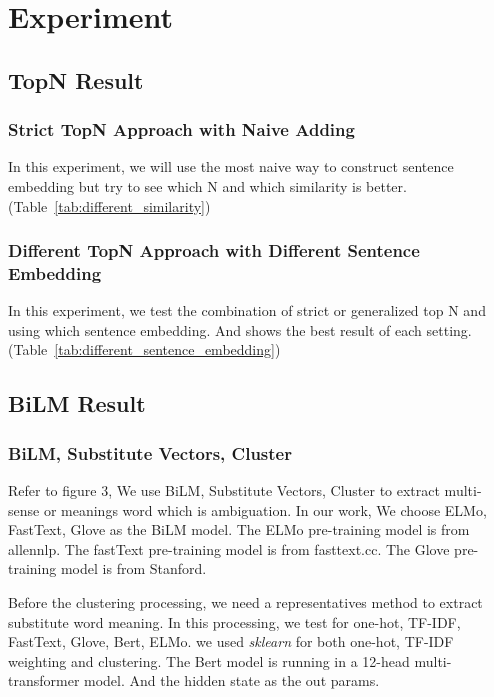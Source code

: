\section{Experiment}
\label{sec:experiment}

\subsection*{TopN Result}

\subsubsection*{Strict TopN Approach with Naive Adding}

In this experiment, we will use the most naive way to construct sentence embedding but try to see which N and which similarity is better. (Table~\ref{tab:different_similarity})




\subsubsection*{Different TopN Approach with Different Sentence Embedding}

In this experiment, we test the combination of strict or generalized top N and using which sentence embedding. And shows the best result of each setting. (Table~\ref{tab:different_sentence_embedding})



\subsection*{BiLM Result}

\subsubsection*{BiLM, Substitute Vectors, Cluster}
Refer to figure 3, We use BiLM, Substitute Vectors, Cluster to extract multi-sense or meanings word which is ambiguation.
In our work, We choose ELMo, FastText, Glove as the BiLM model.
The ELMo pre-training model is from allennlp.
The fastText pre-training model is from fasttext.cc.
The Glove\cite{pennington2014glove} pre-training model is from Stanford. 

Before the clustering processing, we need a representatives method to extract substitute word meaning.
In this processing, we test for one-hot, TF-IDF, FastText, Glove, Bert, ELMo.
we used \emph{sklearn} for both one-hot, TF-IDF weighting and clustering.
The Bert model is running in a 12-head multi-transformer model. 
And the hidden state as the out params.

